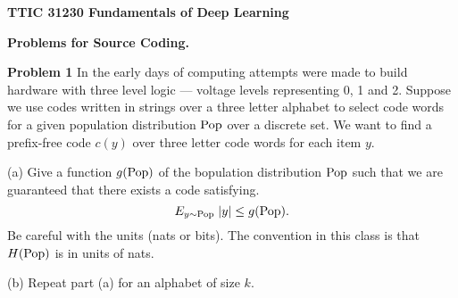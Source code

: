 \documentclass{article}
\newcommand{\solution}[1]{}
\begin{document}
\centerline{\bf TTIC 31230 Fundamentals of Deep Learning}

\bigskip

\centerline{\bf Problems for Source Coding.}

\bigskip
\bigskip

{\bf Problem 1}
In the early days of computing attempts were made to build hardware with three level logic --- voltage levels representing
0, 1 and 2.  Suppose we use codes written in strings over a three letter alphabet to select code words for a given population
distribution $\mathrm{Pop}$ over a discrete set.  We want to find a prefix-free code $c(y)$ over three letter code words
for each item $y$.

\medskip
(a) Give a function $g(\mathrm{Pop})$ of the bopulation distribution $\mathrm{Pop}$ such that we are guaranteed
that there exists a code satisfying.
$$E_{y \sim \mathrm{Pop}}\;|y| \leq g(\mathrm{Pop}).$$
Be careful with the units (nats or bits).  The convention in this class is that $H(\mathrm{Pop})$ is in units of nats.


\solution{
  $$E_{y \sim \pop}\;|y| \leq \frac{H(\pop)}{\ln 3} + 1$$
}

\medskip
(b) Repeat part (a) for an alphabet of size $k$.

\solution{
  $$E_{y \sim \pop}\;|y| \leq \frac{H(\pop)}{\ln k} + 1$$
}
\end{document}
